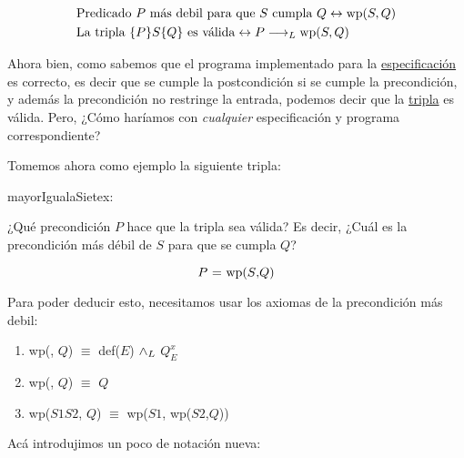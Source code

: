 \documentclass[../main.tex]{subfiles}
\begin{document}
\begin{align}
    & \text{Predicado $P$ más debil para que $S$ cumpla $Q$} \leftrightarrow \text{wp}(S, Q) \label{wp_definition} \\
    & \text{La tripla $\{P\}S\{Q\}$ es válida} \leftrightarrow P \longrightarrow _L \text{wp}(S,Q) \label{wp_validity}
\end{align}

Ahora bien, como sabemos que el programa implementado para la \hyperref[specification_example_1]{especificación} es correcto, es decir que se cumple la postcondición si se cumple la precondición,
y además la precondición no restringe la entrada, podemos decir que la \hyperref[specification_example_1_triplet]{tripla} es válida. Pero, ¿Cómo haríamos con \textit{cualquier} especificación y programa
correspondiente?

Tomemos ahora como ejemplo la siguiente tripla:

\begin{proc}{mayorIgualaSiete}{\Inout x: \Z}{}
        \par
         \par
\end{proc} \label{specification_example_2_triplet}

¿Qué precondición $P$ hace que la tripla sea válida? Es decir, ¿Cuál es la precondición más débil de $S$ para que se cumpla $Q$?

\begin{equation*}
    \text{$P$ = \text{wp}($S$,$Q$)}
\end{equation*}

Para poder deducir esto, necesitamos usar los axiomas de la precondición más debil:

\begin{enumerate}
    \item wp(, $Q$) $\equiv$ def($E$) $\land _L$ $Q_{E}^x$
    \item wp(, $Q$) $\equiv$ $Q$
    \item wp($S1$\mono{;}$S2$, $Q$) $\equiv$ wp($S1$, wp($S2$,$Q$))
\end{enumerate}

\newpage Acá introdujimos un poco de notación nueva:
\end{document}
